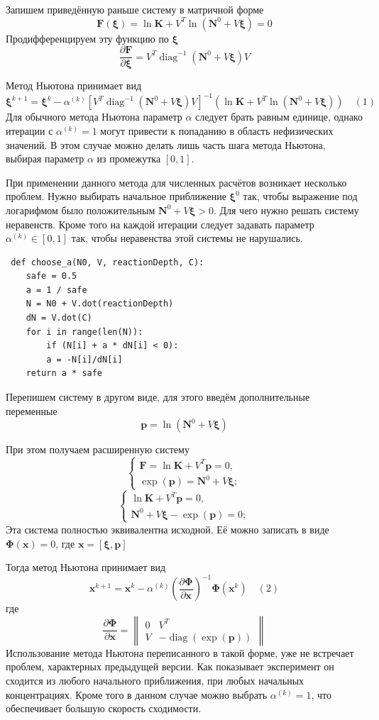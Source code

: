 \documentclass[14pt,a4paper]{extarticle}
\newcommand{\pd}[2]{\frac{\partial #1}{\partial #2}}
\newcommand{\diag}{\operatorname{diag}}
\renewcommand{\vec}[1]{\boldsymbol{\mathbf{#1}}}
\begin{document}
Запишем приведённую раньше систему в матричной форме$$\vec{F}(\vec \xi) = \ln{\vec{K}} + V^T \ln{(\vec{N}^0 + V\vec \xi)} = 0$$
Продифференцируем эту функцию по $\vec \xi$
$$\frac{\partial \vec{F}}{\partial{\vec{\xi}}} = V^T\diag^{-1}(\vec{N}^0 + V\vec{\xi})V$$

Метод Ньютона принимает вид
$$\vec{\xi}^{k+1} = \vec{\xi}^{k} - \alpha^{(k)}[V^T\diag^{-1}(\vec{N}^0 + V\vec{\xi})V]^{-1}(\ln{\vec{K}} + V^T \ln{(\vec{N}^0 + V\vec{\xi})}) \quad (1)$$
Для обычного метода Ньютона параметр $\alpha$ следует брать равным единице, однако итерации с $\alpha^{(k)} = 1$ могут привести к попаданию в область нефизических значений. В этом случае можно делать лишь часть шага метода Ньютона, выбирая параметр $\alpha$ из промежутка $[0, 1]$.   

При применении данного метода для численных расчётов возникает несколько проблем. Нужно выбирать начальное приближение $\vec{\xi}^0$ так, чтобы выражение под логарифмом было положительным $\vec{N}^0 + V\vec{\xi} > 0$. Для чего нужно решать систему неравенств. Кроме того на каждой итерации следует задавать параметр $\alpha^{(k)} \in [0,1]$ так, чтобы неравенства этой системы не нарушались.  

\begin{verbatim}
 def choose_a(N0, V, reactionDepth, C):
    safe = 0.5
    a = 1 / safe
    N = N0 + V.dot(reactionDepth)
    dN = V.dot(C)
    for i in range(len(N)):
    	if (N[i] + a * dN[i] < 0):
    	a = -N[i]/dN[i]
    return a * safe
\end{verbatim}

Перепишем систему в другом виде, для этого введём дополнительные переменные $$\vec{p} = \ln{(\vec{N}^0 + V\vec{\xi})}$$ 

При этом получаем расширенную систему
$$\begin{cases} 
	\vec{F} = \ln{\vec{K}} + V^T\vec{p}=0,\\
	\exp(\vec{p})=\vec{N}^0 + V\vec{\xi};
	
\end{cases}$$
$$\begin{cases} 
	\ln{\vec{K}} + V^T\vec{p}=0,\\
	\vec{N}^0 + V\vec{\xi} - \exp(\vec{p}) = 0;
\end{cases}$$
Эта система полностью эквивалентна исходной. Её можно записать в виде
$\vec{\Phi}(\vec{x}) = 0$, где $ \vec{x} = [\vec{\xi}, \vec{p}]$

Тогда метод Ньютона принимает вид\\
$$\vec{x}^{k+1} = \vec{x}^{k} - \alpha^{(k)}\left(\pd{\vec{\Phi}}{\vec{x}}\right)^{-1}\vec{\Phi}(\vec x^k) \quad (2)$$
 где $$\pd{\vec{\Phi}}{\vec{x}} = \begin{Vmatrix}
 0 & V^T \\
 V & -\diag({\exp(\vec{p})})
\end{Vmatrix}  $$
Использование метода Ньютона переписанного в такой форме, уже не встречает проблем, характерных предыдущей версии. Как показывает эксперимент он сходится из любого начального приближения, при любых начальных концентрациях. Кроме того в данном случае можно выбрать $\alpha^{(k)} = 1$, что обеспечивает большую скорость сходимости.
\end{document}
